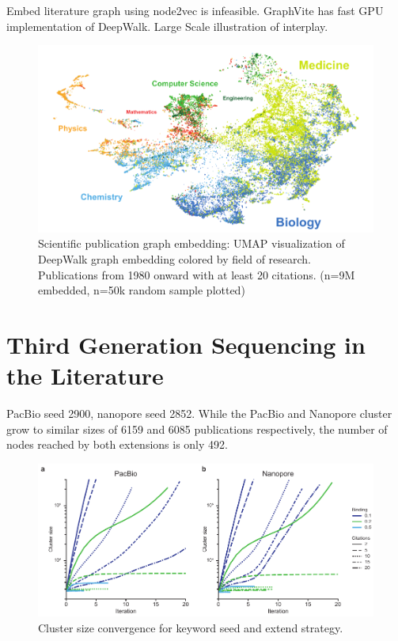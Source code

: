 Embed literature graph using node2vec is infeasible. GraphVite has fast GPU implementation of DeepWalk.
Large Scale illustration of interplay.

\begin{figure}[h]
	\centering
	\includegraphics[width=1.0\textwidth]{figures/state_of_art/umap_global.pdf}
	\captionsetup{format=plain}
	\caption[Scientific literature graph]{Scientific publication graph embedding: UMAP visualization of DeepWalk graph embedding colored by field of research. Publications from 1980 onward with at least 20 citations. (n=9M embedded, n=50k random sample plotted)}
	\label{fig:state_of_art:umap_global}
\end{figure}




\section{Third Generation Sequencing in the Literature}
\label{sec:state_of_art:third_generation}

PacBio seed 2900, nanopore seed 2852.
While the PacBio and Nanopore cluster grow to similar sizes of 6159 and 6085 publications respectively, the number of nodes reached by both extensions is only 492.


\begin{figure}[h]
	\centering
	\includegraphics[width=1.0\textwidth]{figures/state_of_art/cluster_convergence.pdf}
	\captionsetup{format=plain}
	\caption[Keyword Seed and Extend Convergence]{Cluster size convergence for keyword seed and extend strategy.}
	\label{fig:state_of_art:cluster_convergence}
\end{figure}

